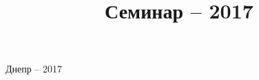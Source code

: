 \documentclass[10pt,utf8]{beamer}
\author{\dissauthorRu}
\title{Семинар -- 2017 }
\begin{document}
\begin{frame}
  \frametitle{}
  \begin{center}
    {\LARGE \color{blue} \booknameRu}

    \vfill

    {\large \dissauthorMain}

    \vfill

    Днепр -- 2017
  \end{center}
\end{frame}


\begin{frame}
  \frametitle{}


\end{frame}



\begin{frame}
  \frametitle{}


\end{frame}




\begin{frame}
  \frametitle{}


\end{frame}




\begin{frame}
  \frametitle{}


\end{frame}




\begin{frame}
  \frametitle{}


\end{frame}




\begin{frame}
  \frametitle{}


\end{frame}
\end{document}
